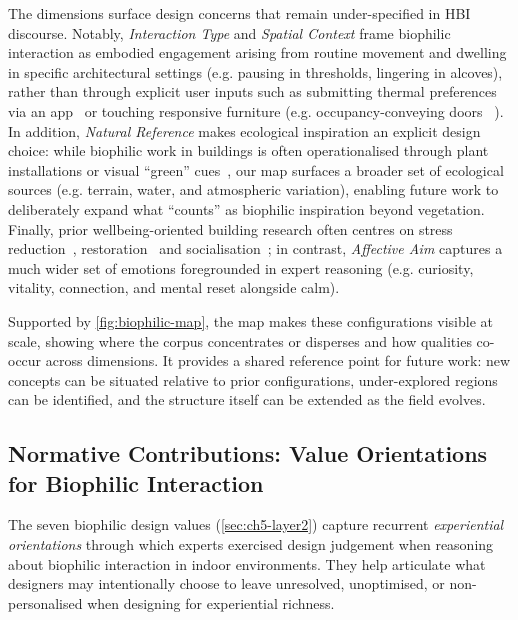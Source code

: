 The dimensions surface design concerns that remain under-specified in HBI discourse. Notably, \emph{Interaction Type} and \emph{Spatial Context} frame biophilic interaction as embodied engagement arising from routine movement and dwelling in specific architectural settings (e.g. pausing in thresholds, lingering in alcoves), rather than through explicit user inputs such as submitting thermal preferences via an app~\cite{kudryashova2020interactive, clear2013understanding} or touching responsive furniture (e.g. occupancy-conveying doors ~\cite{economidou2021no}). In addition, \emph{Natural Reference} makes ecological inspiration an explicit design choice: while biophilic work in buildings is often operationalised through plant installations or visual ``green'' cues~\cite{buechley2010living, feng2019livenature}, our map surfaces a broader set of ecological sources (e.g. terrain, water, and atmospheric variation), enabling future work to deliberately expand what ``counts'' as biophilic inspiration beyond vegetation. Finally, prior wellbeing-oriented building research often centres on stress reduction~\cite{feng2019livenature, wang2014livenature}, restoration~\cite{angelini2015multisensory} and socialisation~\cite{nguyen2023engaging, nguyen2024adaptive}; in contrast, \emph{Affective Aim} captures a much wider set of emotions foregrounded in expert reasoning (e.g. curiosity, vitality, connection, and mental reset alongside calm).

Supported by \autoref{fig:biophilic-map}, the map makes these configurations visible at scale, showing where the corpus concentrates or disperses and how qualities co-occur across dimensions. It provides a shared reference point for future work: new concepts can be situated relative to prior configurations, under-explored regions can be identified, and the structure itself can be extended as the field evolves.

\subsection{Normative Contributions: Value Orientations for Biophilic Interaction}
\label{subsec:ch5-layer2-discussion}
The seven biophilic design values (\autoref{sec:ch5-layer2}) capture recurrent \emph{experiential orientations} through which experts exercised design judgement when reasoning about biophilic interaction in indoor environments. They help articulate what designers may intentionally choose to leave unresolved, unoptimised, or non-personalised when designing for experiential richness.

